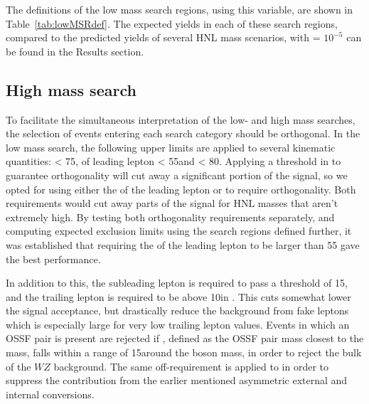 The definitions of the low mass
search regions, using this variable, are shown in
Table~\ref{tab:lowMSRdef}. The expected yields in each of these search
regions, compared to the predicted yields of several HNL mass
scenarios, with \mixpar = $10^{-5}$ can be found in the Results
section.  

\begin{table}[tbh]
\centering
\caption{Search regions in the low mass category.}
\label{tab:lowMSRdef}
\end{table}



\subsection{High mass search}
To facilitate the simultaneous interpretation of the low- and high mass searches, the selection of events entering each search category should be orthogonal. In the low mass search, the following upper limits are applied to several kinematic quantities: 
\ptmiss < 75\GeV, \pt of leading lepton < 55\GeV and \mlll<
80\GeV. Applying a threshold in \met to guarantee orthogonality will
cut away a significant portion of the signal, so we opted for using
either the \pt of the leading lepton or \mlll to require
orthogonality. Both requirements would cut away parts of the signal
for HNL masses that aren't extremely high. By testing both
orthogonality requirements separately, and computing expected
exclusion limits using the search regions defined further,
 it was established that requiring the \pt of the leading lepton to be
 larger than 55 \GeV gave the best performance.
 
In addition to this, the subleading lepton is
 required to pass a \pt threshold of 15\GeV, and the trailing lepton
 is required to be above 10\GeV in \pt .
 This cuts somewhat lower the signal acceptance, but drastically
 reduce the background from fake leptons which is especially large for
 very low trailing lepton \pt values. Events in which an OSSF pair is
 present are rejected if \Mll, defined as the OSSF pair mass closest
 to the \PZ mass, falls within a range of 15\GeV around the \PZ boson
 mass, in order to reject the bulk of the $WZ$ background.
 The same off-\PZ requirement is applied to \mlll in order to suppress
 the contribution from the earlier mentioned asymmetric external and
 internal conversions.

